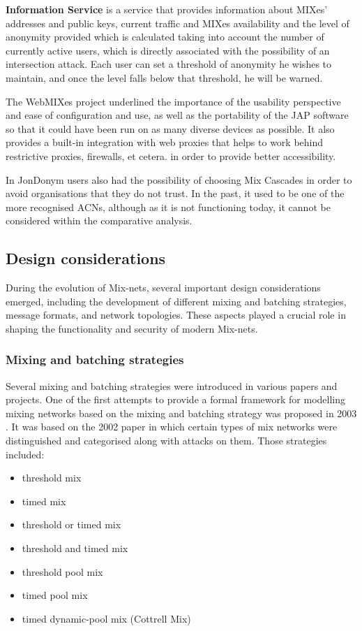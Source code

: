 \textbf{Information Service} is a service that provides information about MIXes' addresses and public keys, current traffic and MIXes availability and the level of anonymity provided which is calculated taking into account the number of currently active users, which is directly associated with the possibility of an intersection attack. Each user can set a threshold of anonymity he wishes to maintain, and once the level falls below that threshold, he will be warned.

The WebMIXes project underlined the importance of the usability perspective and ease of configuration and use, as well as the portability of the JAP software so that it could have been run on as many diverse devices as possible. It also provides a built-in integration with web proxies that helps to work behind restrictive proxies, firewalls, et cetera. in order to provide better accessibility.

In JonDonym users also had the possibility of choosing Mix Cascades in order to avoid organisations that they do not trust. In the past, it used to be one of the more recognised ACNs, although as it is not functioning today, it cannot be considered within the comparative analysis.

\subsection{Design considerations}

During the evolution of Mix-nets, several important design considerations emerged, including the development of different mixing and batching strategies, message formats, and network topologies. These aspects played a crucial role in shaping the functionality and security of modern Mix-nets.

\subsubsection{Mixing and batching strategies}
Several mixing and batching strategies were introduced in various papers and projects. One of the first attempts to provide a formal framework for modelling mixing networks based on the mixing and batching strategy was proposed in 2003 \cite{generalising}. It was based on the 2002 paper \cite{mix-attacks} in which certain types of mix networks were distinguished and categorised along with attacks on them. Those strategies included:
\begin{itemize}
    \item threshold mix
    \item timed mix
    \item threshold or timed mix
    \item threshold and timed mix
    \item threshold pool mix
    \item timed pool mix
    \item timed dynamic-pool mix (Cottrell Mix)
\end{itemize}

